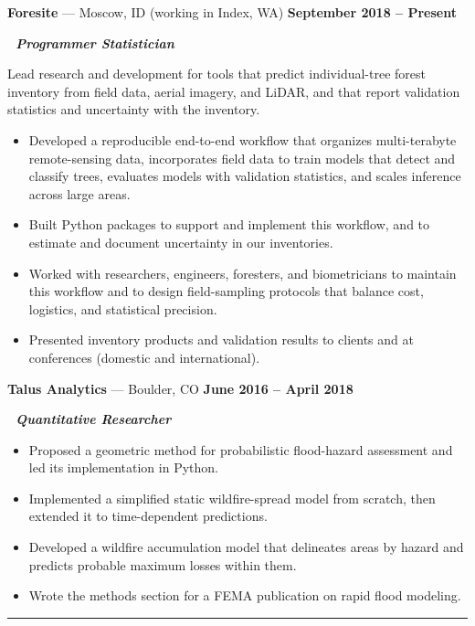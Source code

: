 \documentclass[10pt]{article}
\begin{document}
\noindent
\textbf{Foresite} --- Moscow, ID (working in Index, WA) \hfill \textbf{September 2018 -- Present}

\noindent
\,\,
\textbf{\textit{Programmer Statistician}} 

\noindent
Lead research and development for tools that predict individual-tree forest inventory from field data, aerial imagery, and LiDAR, and that report validation statistics and uncertainty with the inventory.

\begin{itemize}[leftmargin = .35in]
\item Developed a reproducible end-to-end workflow that organizes multi-terabyte remote-sensing data, incorporates field data to train models that detect and classify trees, evaluates models with validation statistics, and scales inference across large areas.
\item Built Python packages to support and implement this workflow, and to estimate and document uncertainty in our inventories.
\item Worked with researchers, engineers, foresters, and biometricians to maintain this workflow and to design field-sampling protocols that balance cost, logistics, and statistical precision.
\item Presented inventory products and validation results to clients and at conferences (domestic and international).
\end{itemize}

\vspace{2.5mm}
\noindent
\textbf{Talus Analytics} --- Boulder, CO \hfill \textbf{June 2016 -- April 2018}

\noindent
\,\,
\textbf{\textit{Quantitative Researcher}}

\begin{itemize}[leftmargin = .35in]
\item Proposed a geometric method for probabilistic flood-hazard assessment and led its implementation in Python.
\item Implemented a simplified static wildfire-spread model from scratch, then extended it to time-dependent predictions.
\item Developed a wildfire accumulation model that delineates areas by hazard and predicts probable maximum losses within them.
\item Wrote the methods section for a FEMA publication on rapid flood modeling.
\end{itemize}

\vspace{1.5mm}
\noindent
\rule{\textwidth}{0.4pt}\\
\vspace{1.5mm}
\end{document}
